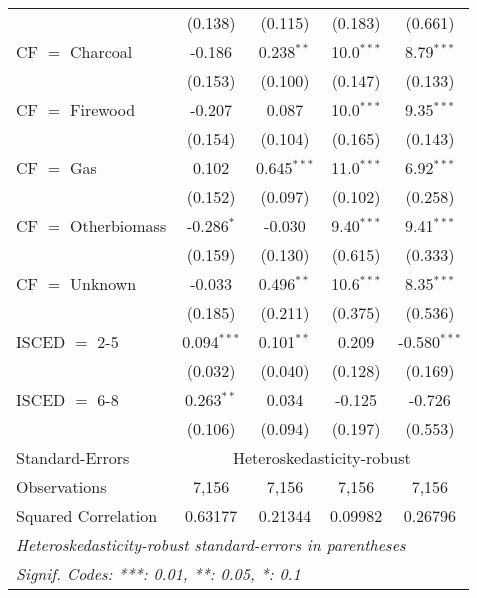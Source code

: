 \begin{table}[htbp!]
\begin{adjustbox}{width = 1\textwidth, max height = 0.95\textheight, center}
\begin{threeparttable}[b]
\begin{tabular}{lcccc}
                                 & (0.138)            & (0.115)            & (0.183)       & (0.661)\\   
            CF $=$ Charcoal      & -0.186             & 0.238$^{**}$       & 10.0$^{***}$  & 8.79$^{***}$\\   
                                 & (0.153)            & (0.100)            & (0.147)       & (0.133)\\   
            CF $=$ Firewood      & -0.207             & 0.087              & 10.0$^{***}$  & 9.35$^{***}$\\   
                                 & (0.154)            & (0.104)            & (0.165)       & (0.143)\\   
            CF $=$ Gas           & 0.102              & 0.645$^{***}$      & 11.0$^{***}$  & 6.92$^{***}$\\   
                                 & (0.152)            & (0.097)            & (0.102)       & (0.258)\\   
            CF $=$ Otherbiomass  & -0.286$^{*}$       & -0.030             & 9.40$^{***}$  & 9.41$^{***}$\\   
                                 & (0.159)            & (0.130)            & (0.615)       & (0.333)\\   
            CF $=$ Unknown       & -0.033             & 0.496$^{**}$       & 10.6$^{***}$  & 8.35$^{***}$\\   
                                 & (0.185)            & (0.211)            & (0.375)       & (0.536)\\   
            ISCED $=$ 2-5        & 0.094$^{***}$      & 0.101$^{**}$       & 0.209         & -0.580$^{***}$\\   
                                 & (0.032)            & (0.040)            & (0.128)       & (0.169)\\   
            ISCED $=$ 6-8        & 0.263$^{**}$       & 0.034              & -0.125        & -0.726\\   
                                 & (0.106)            & (0.094)            & (0.197)       & (0.553)\\   
            \midrule 
            Standard-Errors & \multicolumn{4}{c}{Heteroskedasticity-robust} \\ 
            Observations         & 7,156              & 7,156              & 7,156         & 7,156\\  
            Squared Correlation  & 0.63177            & 0.21344            & 0.09982       & 0.26796\\  
            \midrule \midrule
            \multicolumn{5}{l}{\emph{Heteroskedasticity-robust standard-errors in parentheses}}\\
            \multicolumn{5}{l}{\emph{Signif. Codes: ***: 0.01, **: 0.05, *: 0.1}}\\
         \end{tabular}
         

\end{threeparttable}
\end{adjustbox}
\end{table}

